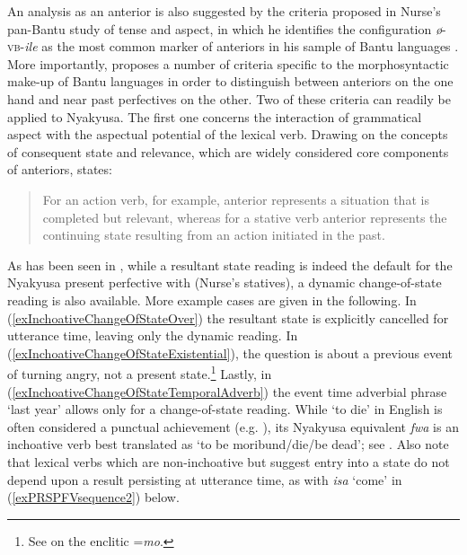 An analysis as an anterior is also suggested by the criteria proposed in Nurse's pan-Bantu study of tense and aspect, in which he identifies the configuration \mbox{\textit{ø}-}\textsc{vb}\mbox{-\textit{ile}} as the most common marker of anteriors in his sample of Bantu languages \citep[156]{NurseD2008}. More importantly, \citet[95--99]{NurseD2008} proposes a number of criteria specific to the morphosyntactic make-up of Bantu languages in order to distinguish between anteriors on the one hand and near past perfectives on the other. Two of these criteria can readily be applied to Nyakyusa. The first one concerns the interaction of grammatical aspect with the aspectual potential of the lexical verb. Drawing on the concepts of consequent state and relevance, which are widely considered core components of anteriors, \citeauthor{NurseD2008} states:
\begin{quote}
For an action verb, for example, anterior represents a situation that is completed but relevant, whereas for a stative verb anterior represents the continuing state resulting from an action initiated in the past. \citep[73]{NurseD2008}
\end{quote}

\newpage 
As has been seen in , while a resultant state reading is indeed the default for the Nyakyusa present perfective with  (Nurse’s statives), a dynamic change-of-state reading is also available. More example cases are given in the following. In (\ref{exInchoativeChangeOfStateOver}) the resultant state is explicitly cancelled for utterance time, leaving only the dynamic reading. In (\ref{exInchoativeChangeOfStateExistential}), the question is about a previous event of turning angry, not a present state.\footnote{See  on the enclitic =\textit{mo}.} Lastly, in (\ref{exInchoativeChangeOfStateTemporalAdverb}) the event time adverbial phrase \lq last year' allows only for a change-of-state reading. While \lq to die' in English is often considered a punctual achievement (e.g. \citealt[54]{DowtyD1979}), its Nyakyusa equivalent \textit{fwa} is an inchoative verb best translated as \lq to be moribund/die/be dead'; see . Also note that lexical verbs which are non-inchoative but suggest entry into a state do not depend upon a result persisting at utterance time, as with \textit{isa} \lq come' in (\ref{exPRSPFVsequence2}) below.

